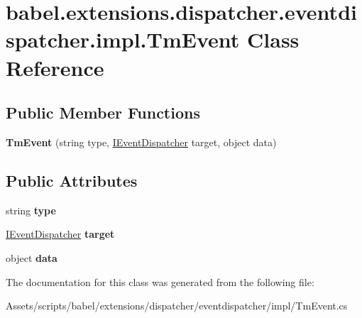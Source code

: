 \hypertarget{classbabel_1_1extensions_1_1dispatcher_1_1eventdispatcher_1_1impl_1_1_tm_event}{\section{babel.\-extensions.\-dispatcher.\-eventdispatcher.\-impl.\-Tm\-Event Class Reference}
\label{classbabel_1_1extensions_1_1dispatcher_1_1eventdispatcher_1_1impl_1_1_tm_event}
}
\subsection*{Public Member Functions}
\begin{DoxyCompactItemize}
\item 
\hypertarget{classbabel_1_1extensions_1_1dispatcher_1_1eventdispatcher_1_1impl_1_1_tm_event_a3b4c05b374a2ccf2cadffc36753a07a2}{{\bfseries Tm\-Event} (string type, \hyperlink{interfacebabel_1_1extensions_1_1dispatcher_1_1eventdispatcher_1_1api_1_1_i_event_dispatcher}{I\-Event\-Dispatcher} target, object data)}\label{classbabel_1_1extensions_1_1dispatcher_1_1eventdispatcher_1_1impl_1_1_tm_event_a3b4c05b374a2ccf2cadffc36753a07a2}

\end{DoxyCompactItemize}
\subsection*{Public Attributes}
\begin{DoxyCompactItemize}
\item 
\hypertarget{classbabel_1_1extensions_1_1dispatcher_1_1eventdispatcher_1_1impl_1_1_tm_event_a54130e4bd477143dda0a1b28cda954f5}{string {\bfseries type}}\label{classbabel_1_1extensions_1_1dispatcher_1_1eventdispatcher_1_1impl_1_1_tm_event_a54130e4bd477143dda0a1b28cda954f5}

\item 
\hypertarget{classbabel_1_1extensions_1_1dispatcher_1_1eventdispatcher_1_1impl_1_1_tm_event_a72736305325aa1e208b89de88fe18c04}{\hyperlink{interfacebabel_1_1extensions_1_1dispatcher_1_1eventdispatcher_1_1api_1_1_i_event_dispatcher}{I\-Event\-Dispatcher} {\bfseries target}}\label{classbabel_1_1extensions_1_1dispatcher_1_1eventdispatcher_1_1impl_1_1_tm_event_a72736305325aa1e208b89de88fe18c04}

\item 
\hypertarget{classbabel_1_1extensions_1_1dispatcher_1_1eventdispatcher_1_1impl_1_1_tm_event_a2119ef61a42013b813218da062371034}{object {\bfseries data}}\label{classbabel_1_1extensions_1_1dispatcher_1_1eventdispatcher_1_1impl_1_1_tm_event_a2119ef61a42013b813218da062371034}

\end{DoxyCompactItemize}


The documentation for this class was generated from the following file\-:\begin{DoxyCompactItemize}
\item 
Assets/scripts/babel/extensions/dispatcher/eventdispatcher/impl/Tm\-Event.\-cs\end{DoxyCompactItemize}
